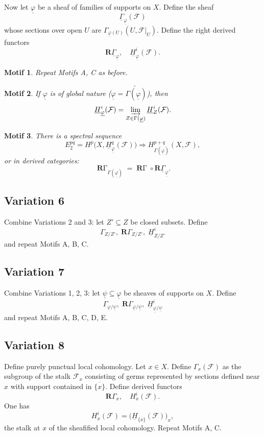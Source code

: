 \documentclass[12pt]{book}
\newcommand{\sheaf}[1]{\mathcal{#1}}
\DeclareMathOperator{\RGamma}{\mathbf{R}\Gamma}
\theoremstyle{plain}
\newtheorem{motif}{Motif}[section]
\begin{document}
Now let \(\underline{\varphi}\) be a sheaf of families of supports on \(X\). Define the sheaf
\[
\underline{\Gamma}_{\underline{\varphi}}(\sheaf{F})
\]
whose sections over open \(U\) are \(\Gamma_{\underline{\varphi}(U)}(U,\sheaf{F}|_U)\).
Define the right derived functors
\[
\mathbf{R}\underline{\Gamma}_{\underline{\varphi}},\quad \underline{H}_{\underline{\varphi}}^i(\sheaf{F}).
\]

\begin{motif}
Repeat Motifs A, C as before.
\end{motif}

\begin{motif}
If \(\underline{\varphi}\) is of \textit{global nature} (\(\underline{\varphi}=\widetilde{\Gamma(\underline{\varphi})}\)), then
\[
\underline{H}_{\underline{\varphi}}^i(\sheaf{F})
= \varinjlim_{Z\in\Gamma(\underline{\varphi})} \underline{H}_Z^i(\sheaf{F}).
\]
\end{motif}

\begin{motif}
There is a spectral sequence
\[
E_2^{pq} = H^p\big(X,\underline{H}_{\underline{\varphi}}^q(\sheaf{F})\big)
\Rightarrow H_{\Gamma(\underline{\varphi})}^{p+q}(X,\sheaf{F}),
\]
or in derived categories:
\[
\RGamma_{\Gamma(\underline{\varphi})}
= \RGamma \circ \mathbf{R}\underline{\Gamma}_{\underline{\varphi}}.
\]
\end{motif}

\setcounter{page}{225}

\subsection{Variation 6}
Combine Variations 2 and 3: let \(Z'\subseteq Z\) be closed subsets. Define
\[
\Gamma_{Z/Z'},\;\mathbf{R}\Gamma_{Z/Z'},\;\underline{H}_{Z/Z'}^i
\]
and repeat Motifs A, B, C.

\subsection{Variation 7}
Combine Variations 1, 2, 3: let \(\underline{\psi}\subseteq\underline{\varphi}\) be sheaves of supports on \(X\). Define
\[
\Gamma_{\underline{\varphi}/\underline{\psi}},\;
\mathbf{R}\Gamma_{\underline{\varphi}/\underline{\psi}},\;
\underline{H}_{\underline{\varphi}/\underline{\psi}}^i
\]
and repeat Motifs A, B, C, D, E.

\subsection{Variation 8}
Define purely punctual local cohomology. Let \(x\in X\). Define \(\Gamma_x(\sheaf{F})\) as the subgroup of the stalk \(\sheaf{F}_x\) consisting of germs represented by sections defined near \(x\) with support contained in \(\overline{\{x\}}\). Define derived functors
\[
\mathbf{R}\Gamma_x,\quad H_x^i(\sheaf{F}).
\]
One has
\[
H_x^i(\sheaf{F})
= \big(\underline{H}_{\overline{\{x\}}}(\sheaf{F})\big)_x,
\]
the stalk at \(x\) of the sheafified local cohomology. Repeat Motifs A, C.
\end{document}
